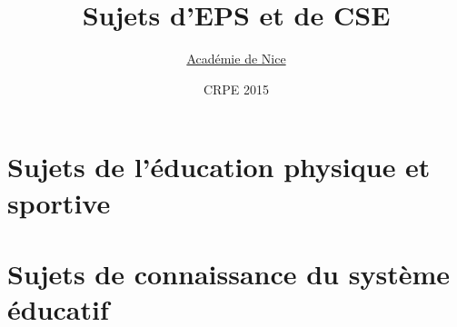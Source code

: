 \documentclass[a4paper]{article}
\title{Sujets d’EPS et de CSE}
\author{\href{http://www2.ac-nice.fr/cid71224/concours-de-recrutement-de-professeurs-des-ecoles-crpe.html}{Académie de Nice}}
\date{CRPE 2015}
\begin{document}
\maketitle


\tableofcontents

\section{Sujets de l’éducation physique et sportive}


\section{Sujets de connaissance du système éducatif}


\end{document}
